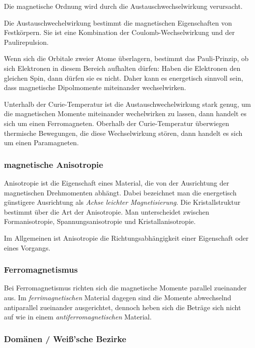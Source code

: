 \documentclass[12pt,a4paper]{scrartcl}
\numberwithin{equation}{section} %
\renewcommand{\[}{} %
\renewcommand{\]}{\noindent} %
\begin{document}
Die magnetische Ordnung wird durch die Austauschwechselwirkung
verursacht.

Die Austauschwechelwirkung bestimmt die magnetischen Eigenschaften von
Festkörpern. Sie ist eine Kombination der Coulomb-Wechselwirkung und der
Paulirepulsion.

Wenn sich die Orbitale zweier Atome überlagern, bestimmt das
Pauli-Prinzip, ob sich Elektronen in diesem Bereich aufhalten dürfen:
Haben die Elektronen den gleichen Spin, dann dürfen sie es nicht. Daher
kann es energetisch sinnvoll sein, dass magnetische Dipolmomente
miteinander wechselwirken.

Unterhalb der Curie-Temperatur ist die Austauschwechelwirkung stark
genug, um die magnetischen Momente miteinander wechelwirken zu lassen,
dann handelt es sich um einen Ferromagneten. Oberhalb der
Curie-Temperatur überwiegen thermische Bewegungen, die diese
Wechselwirkung stören, dann handelt es sich um einen Paramagneten.

\hypertarget{magnetische-anisotropie}{%
\subsubsection{magnetische Anisotropie}\label{magnetische-anisotropie}}

Anisotropie ist die Eigenschaft eines Material, die von der Ausrichtung
der magnetischen Drehmomenten abhängt. Dabei bezeichnet man die
energetisch günstigere Ausrichtung als \emph{Achse leichter
Magnetisierung}. Die Kristallstruktur bestimmt über die Art der
Anisotropie. Man unterscheidet zwischen Formanisotropie,
Spannungsanisotropie und Kristallanisotropie.

Im Allgemeinen ist Anisotropie die Richtungsabhängigkeit einer
Eigenschaft oder eines Vorgangs.

\hypertarget{ferromagnetismus}{%
\subsubsection{Ferromagnetismus}\label{ferromagnetismus}}

Bei Ferromagnetismus richten sich die magnetische Momente parallel
zueinander aus. Im \emph{ferrimagnetischen} Material dagegen sind die
Momente abwechselnd antiparallel zueinander ausgerichtet, dennoch heben
sich die Beträge sich nicht auf wie in einem
\emph{antiferromagnetischen} Material.

\hypertarget{domuxe4nen-weiuxdfsche-bezirke}{%
\subsubsection{Domänen / Weiß'sche
Bezirke}\label{domuxe4nen-weiuxdfsche-bezirke}}
\end{document}
